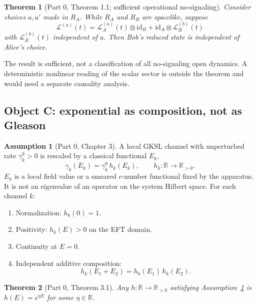 \documentclass[11pt]{article}
\newtheorem{theorem}{Theorem}[section]
\theoremstyle{definition}
\newtheorem{assumption}{Assumption}[section]
\theoremstyle{plain}
\begin{document}
\begin{theorem}[Part 0, Theorem 1.1; sufficient operational no-signaling]\label{thm:nosig}
Consider choices $a, a'$ made in $R_A$. While $R_A$ and $R_B$ are spacelike, suppose
\begin{equation}
\mathcal{L}^{(a)}(t) = \mathcal{L}^{(a)}_A(t)\otimes \mathrm{id}_B + \mathrm{id}_A \otimes \mathcal{L}^{(b)}_B(t)
\label{eq:factor}
\end{equation}
with $\mathcal{L}_B^{(b)}(t)$ independent of $a$. Then Bob's reduced state is independent of Alice's choice.
\end{theorem}

The result is sufficient, not a classification of all no-signaling open dynamics.\cite{Gisin1,Polchinski}
A deterministic nonlinear reading of the scalar sector is outside the theorem and would need a
separate causality analysis.

\subsection{Object C: exponential as composition, not as Gleason}

\begin{assumption}[Part 0, Chapter 3]\label{asm:comp}
A local GKSL channel with unperturbed rate $\gamma_k^0 > 0$ is rescaled by a classical functional $E_k$,
\begin{equation}
\gamma_k(E_k) = \gamma_k^0\, h_k(E_k), \qquad h_k: \mathbb{R}\to\mathbb{R}_{>0}.
\label{eq:hk}
\end{equation}
$E_k$ is a local field value or a smeared $c$-number functional fixed by the apparatus. It is not an
eigenvalue of an operator on the system Hilbert space. For each channel $k$:
\begin{enumerate}
\item Normalization: $h_k(0)=1$.
\item Positivity: $h_k(E) > 0$ on the EFT domain.
\item Continuity at $E=0$.
\item Independent additive composition:
\begin{equation}
h_k(E_1 + E_2) = h_k(E_1)\, h_k(E_2).
\label{eq:cauchy}
\end{equation}
\end{enumerate}
\end{assumption}

\begin{theorem}[Part 0, Theorem 3.1]\label{thm:exp}
Any $h:\mathbb{R}\to\mathbb{R}_{>0}$ satisfying Assumption~\ref{asm:comp} is $h(E) = e^{\eta E}$ for some $\eta\in\mathbb{R}$.
\end{theorem}
\end{document}
